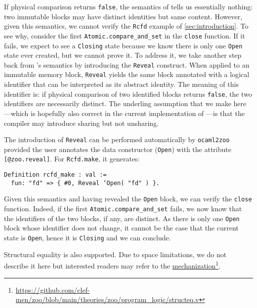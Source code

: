 If physical comparison returns \texttt{false}, the semantics of \OCaml tells us essentially nothing: two immutable blocks may have distinct identities but same content.
However, given this semantics, we cannot verify the \texttt{Rcfd} example of \cref{sec:introduction}.
To see why, consider the first \texttt{Atomic.compare_and_set} in the \texttt{close} function.
If it fails, we expect to see a \texttt{Closing} state because we know there is only one \texttt{Open} state ever created, but we cannot prove it.
To address it, we take another step back from \OCaml's semantics by introducing the \texttt{Reveal} construct.
When applied to an immutable memory block, \texttt{Reveal} yields the same block annotated with a logical identifier that can be interpreted as its abstract identity.
The meaning of this identifier is: if physical comparison of two identified blocks returns \texttt{false}, the two identifiers are necessarily distinct.
The underling assumption that we make here---which is hopefully also correct in the current implementation of \OCaml---is that the compiler may introduce sharing but not unsharing.

The introduction of \texttt{Reveal} can be performed automatically by \texttt{ocaml2zoo} provided the user annotates the data constructor (\eg \texttt{Open}) with the attribute \texttt{[@zoo.reveal]}.
For \texttt{Rcfd.make}, it generates:

\begin{verbatim}
Definition rcfd_make : val :=
  fun: "fd" => { #0, Reveal ‘Open( "fd" ) }.
\end{verbatim}

Given this semantics and having revealed the \texttt{Open} block, we can verify the \texttt{close} function.
Indeed, if the first \texttt{Atomic.compare_and_set} fails, we now know that the identifiers of the two blocks, if any, are distinct.
As there is only one \texttt{Open} block whose identifier does not change, it cannot be the case that the current state is \texttt{Open}, hence it is \texttt{Closing} and we can conclude.

Structural equality is also supported.
Due to space limitations, we do not describe it here but interested readers may refer to the \Coq \href{https://github.com/clef-men/zoo/blob/main/theories/zoo/program_logic/structeq.v}{mechanization}\footnote{\url{https://github.com/clef-men/zoo/blob/main/theories/zoo/program\_logic/structeq.v}}.

